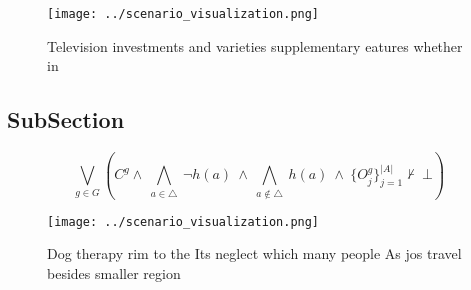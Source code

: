 \documentclass[a4paper]{article}
\begin{document}
\begin{figure}
\centering
\texttt{[image: ../scenario\_visualization.png]}
\caption{Television investments and varieties supplementary eatures whether in
}
\end{figure}
 
\subsection{SubSection}

\[\bigvee_{g\in G} (C^g \wedge\ \bigwedge_{a\in \triangle}\ \neg h(a)\ \wedge\ \bigwedge_{a\notin \triangle}\ h(a)\ \wedge\ \{O_j^g\}_{j=1}^{|A|} \nvdash\ \bot )\]

\begin{figure}
\centering
\texttt{[image: ../scenario\_visualization.png]}
\caption{Dog therapy rim to the Its neglect which many people As jos travel besides smaller region
}
\end{figure}
 
\end{document}
